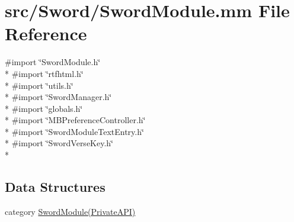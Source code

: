 \hypertarget{_sword_module_8mm}{\section{src/\-Sword/\-Sword\-Module.mm File Reference}
\label{_sword_module_8mm}
}
{\ttfamily \#import \char`\"{}Sword\-Module.\-h\char`\"{}}\\*
{\ttfamily \#import \char`\"{}rtfhtml.\-h\char`\"{}}\\*
{\ttfamily \#import \char`\"{}utils.\-h\char`\"{}}\\*
{\ttfamily \#import \char`\"{}Sword\-Manager.\-h\char`\"{}}\\*
{\ttfamily \#import \char`\"{}globals.\-h\char`\"{}}\\*
{\ttfamily \#import \char`\"{}M\-B\-Preference\-Controller.\-h\char`\"{}}\\*
{\ttfamily \#import \char`\"{}Sword\-Module\-Text\-Entry.\-h\char`\"{}}\\*
{\ttfamily \#import \char`\"{}Sword\-Verse\-Key.\-h\char`\"{}}\\*
\subsection*{Data Structures}
\begin{DoxyCompactItemize}
\item 
category \hyperlink{category_sword_module_07_private_a_p_i_08}{Sword\-Module(\-Private\-A\-P\-I)}
\end{DoxyCompactItemize}
